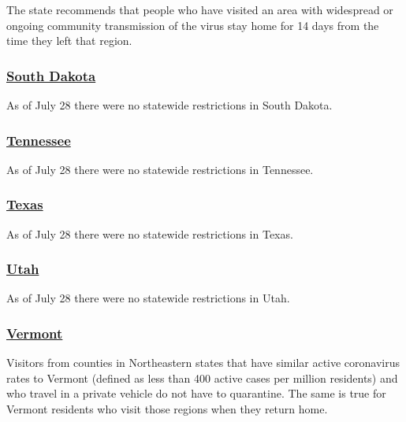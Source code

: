 The state recommends that people who have visited an area with
widespread or ongoing community transmission of the virus stay home for
14 days from the time they left that region.

\hypertarget{south-dakota}{%
\subsubsection{\texorpdfstring{\href{https://www.travelsouthdakota.com/coronavirus-covid-19}{South
Dakota}}{South Dakota}}\label{south-dakota}}

As of July 28 there were no statewide restrictions in South Dakota.

\hypertarget{tennessee}{%
\subsubsection{\texorpdfstring{\href{https://www.tnvacation.com/articles/tennessee-travel-amid-coronavirus}{Tennessee}}{Tennessee}}\label{tennessee}}

As of July 28 there were no statewide restrictions in Tennessee.

\hypertarget{texas}{%
\subsubsection{\texorpdfstring{\href{https://gov.texas.gov/travel-texas/page/covid19}{Texas}}{Texas}}\label{texas}}

As of July 28 there were no statewide restrictions in Texas.

\hypertarget{utah}{%
\subsubsection{\texorpdfstring{\href{https://www.visitutah.com/plan-your-trip/covid-19/}{Utah}}{Utah}}\label{utah}}

As of July 28 there were no statewide restrictions in Utah.

\hypertarget{vermont}{%
\subsubsection{\texorpdfstring{\href{https://www.healthvermont.gov/response/coronavirus-covid-19/traveling-vermont}{Vermont}}{Vermont}}\label{vermont}}

Visitors from counties in Northeastern states that have similar active
coronavirus rates to Vermont (defined as less than 400 active cases per
million residents) and who travel in a private vehicle do not have to
quarantine. The same is true for Vermont residents who visit those
regions when they return home.

